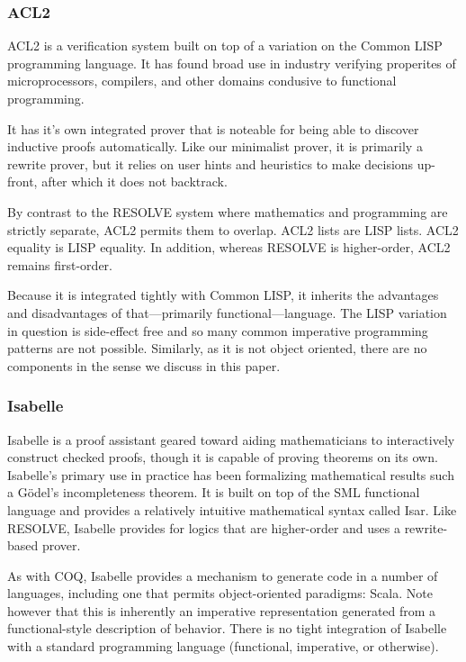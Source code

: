 \subsubsection{ACL2}\label{sec:ACL2}
ACL2 is a verification system built on top of a variation on the Common LISP programming language.  It has found broad use in industry verifying properites of microprocessors, compilers, and other domains condusive to functional programming.  

It has it's own integrated prover that is noteable for being able to discover inductive proofs automatically.  Like our minimalist prover, it is primarily a rewrite prover, but it relies on user hints and heuristics to make decisions up-front, after which it does not backtrack.

By contrast to the RESOLVE system where mathematics and programming are strictly separate, ACL2 permits them to overlap.  ACL2 lists are LISP lists.  ACL2 equality is LISP equality.  In addition, whereas RESOLVE is higher-order, ACL2 remains first-order.

Because it is integrated tightly with Common LISP, it inherits the advantages and disadvantages of that---primarily functional---language.  The LISP variation in question is side-effect free and so many common imperative programming patterns are not possible.  Similarly, as it is not object oriented, there are no components in the sense we discuss in this paper.

\subsubsection{Isabelle}\label{sec:Isabelle}
Isabelle is a proof assistant geared toward aiding mathematicians to interactively construct checked proofs, though it is capable of proving theorems on its own.  Isabelle's primary use in practice has been formalizing mathematical results such a G\"{o}del's incompleteness theorem.  It is built on top of the SML functional language and provides a relatively intuitive mathematical syntax called Isar.  Like RESOLVE, Isabelle provides for logics that are higher-order and uses a rewrite-based prover.

As with COQ, Isabelle provides a mechanism to generate code in a number of languages, including one that permits object-oriented paradigms: Scala.  Note however that this is inherently an imperative representation generated from a functional-style description of behavior.  There is no tight integration of Isabelle with a standard programming language (functional, imperative, or otherwise).

